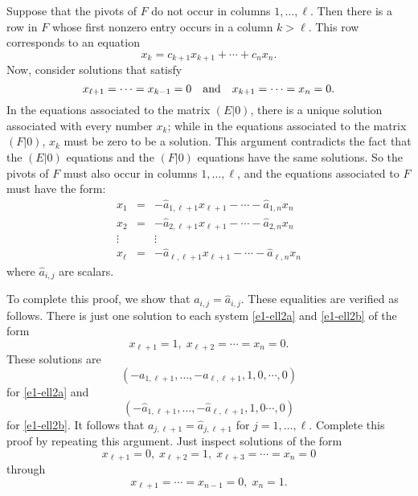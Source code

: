 \documentclass{ximera}
\begin{document}
Suppose that the pivots of $F$ do not occur in columns $1,\ldots,\ell$.  Then
there is a row in $F$ whose first nonzero entry occurs in a column $k>\ell$. 
This row corresponds to an equation
\[
x_k = c_{k+1}x_{k+1} + \cdots + c_nx_n.
\]
Now, consider solutions that satisfy
\[
x_{\ell+1} = \cdots = x_{k-1} = 0 \quad\mbox{and}\quad x_{k+1} = \cdots = x_n = 0.
\]
In the equations associated to the matrix $(E|0)$, there is a unique solution
associated with every number $x_k$; while in the equations associated to the 
matrix $(F|0)$, $x_k$ must be zero to be a solution.  This argument
contradicts the fact that the $(E|0)$ equations and the $(F|0)$
equations have the same solutions.  So the pivots of $F$ must also occur in 
columns $1,\ldots,\ell$, and the equations associated to $F$ must have the 
form:
\begin{equation} \label{e1-ell2b}
\begin{array}{rcl}
x_1  & = & - \hat{a}_{1,\ell+1}x_{\ell+1} - \cdots - \hat{a}_{1,n}x_n \\
x_2  & = & - \hat{a}_{2,\ell+1}x_{\ell+1} - \cdots - \hat{a}_{2,n}x_n \\
\vdots &   &    \vdots  \\
x_\ell & = & - \hat{a}_{\ell,\ell+1}x_{\ell+1} - \cdots - \hat{a}_{\ell,n}x_n
\end{array}
\end{equation}
where $\hat{a}_{i,j}$ are scalars.

To complete this proof, we show that $a_{i,j}=\hat{a}_{i,j}$.  These 
equalities are verified as follows.  There is just one solution to each 
system \eqref{e1-ell2a} and \eqref{e1-ell2b} of the form
\[
x_{\ell+1}=1,\; x_{\ell+2}=\cdots=x_n=0.
\]
These solutions are
\[
(-a_{1,\ell+1}, \ldots, -a_{\ell,\ell+1},1,0,\cdots,0)
\]
for \eqref{e1-ell2a} and
\[
(-\hat{a}_{1,\ell+1},\ldots,-\hat{a}_{\ell,\ell+1},1,0\cdots,0)
\]
for \eqref{e1-ell2b}. It follows that $a_{j,\ell+1}=\hat{a}_{j,\ell+1}$
for $j=1,\ldots,\ell$.  Complete this proof by repeating this argument. 
Just inspect solutions of the form
\[
x_{\ell+1}=0,\; x_{\ell+2}=1,\; x_{\ell+3}=\cdots= x_n=0
\]
through
\[
x_{\ell+1}=\cdots = x_{n-1}=0,\; x_n=1.
\]
\end{document}
